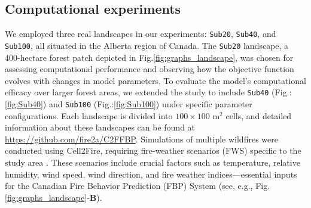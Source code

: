 \documentclass[a4paper,fleqn]{cas-sc}
\begin{document}
\subsection{Computational experiments}

We employed three real landscapes in our experiments: \texttt{Sub20}, \texttt{Sub40}, and \texttt{Sub100}, all situated in the Alberta region of Canada. The \texttt{Sub20} landscape, a 400-hectare forest patch depicted in Fig.\:\ref{fig:graphs_landscape}, was chosen for assessing computational performance and observing how the objective function evolves with changes in model parameters. To evaluate the model's computational efficacy over larger forest areas, we extended the study to include \texttt{Sub40} (Fig.:\ref{fig:Sub40}) and \texttt{Sub100} (Fig.:\ref{fig:Sub100}) under specific parameter configurations. Each landscape is divided into $100 \times 100$ m$^2$ cells, and detailed information about these landscapes can be found at \url{https://github.com/fire2a/C2FFBP}. Simulations of multiple wildfires were conducted using Cell2Fire, requiring fire-weather scenarios (FWS) specific to the study area \citep{parisien2005mapping, pais2021cell2fire}. These scenarios include crucial factors such as temperature, relative humidity, wind speed, wind direction, and fire weather indices—essential inputs for the Canadian Fire Behavior Prediction (FBP) System \citep{hirsch1996canadian} (see, e.g., Fig.\:\ref{fig:graphs_landscape}-\textbf{B}).
\end{document}
